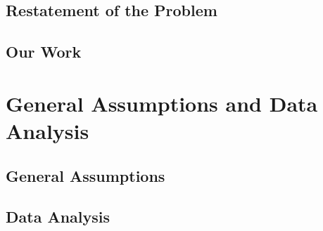 \documentclass{mcmthesis}
\newlength\savewidth
\newcommand\shline{\noalign{\global\savewidth\arrayrulewidth
                            \global\arrayrulewidth 1.5pt}%
                   \hline
                   \noalign{\global\arrayrulewidth\savewidth}}
\begin{document}
\subsection{Restatement of the Problem}
\subsection{Our Work}


\section{General Assumptions and Data Analysis}
\subsection{General Assumptions}
\subsection{Data Analysis}
\end{document}
